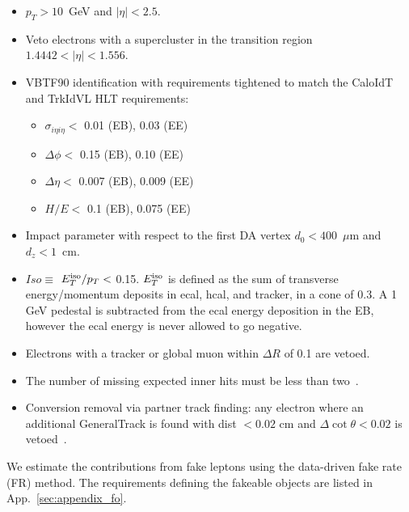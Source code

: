 \begin{itemize}

\item $p_{T}>10$~GeV and $|\eta| < 2.5$.

\item Veto electrons with a supercluster in the transition region $1.4442 < |\eta| < 1.556$.

\item VBTF90 identification\cite{ref:vbtf} with requirements tightened to match the CaloIdT and TrkIdVL HLT requirements:

  \begin{itemize}
  \item $\sigma_{i\eta i\eta} < $ 0.01 (EB), 0.03 (EE)
  \item $\Delta\phi < $ 0.15 (EB), 0.10 (EE)
  \item $\Delta\eta < $ 0.007 (EB), 0.009 (EE)
  \item $H/E < $ 0.1 (EB), 0.075 (EE)
  \end{itemize}  

\item Impact parameter with respect to the first DA vertex $d_0 < 400$~$\mu$m and $d_z < 1$~cm.

\item $Iso \equiv $ $E_T^{\rm iso}/p_T < $ 0.15.  $E_T^{\rm iso}$
is defined as the sum of transverse energy/momentum deposits in ecal,
hcal, and tracker, in a 
cone of 0.3.  A 1 GeV pedestal is subtracted from the ecal energy 
deposition in the EB, however the ecal energy is never allowed to 
go negative.

\item Electrons with a tracker or global muon within $\Delta R$ of 
0.1 are vetoed.

\item The number of missing expected inner hits must be less than 
two~\cite{ref:conv}.

\item Conversion removal via partner track finding: any electron
where an additional GeneralTrack is found with dist $< 0.02$ cm 
and $\Delta\cot\theta < 0.02$ is vetoed~\cite{ref:conv}.


\end{itemize}

We estimate the contributions from fake leptons using the data-driven
fake rate (FR) method. The requirements defining the fakeable objects 
are listed in App.~\ref{sec:appendix_fo}.


